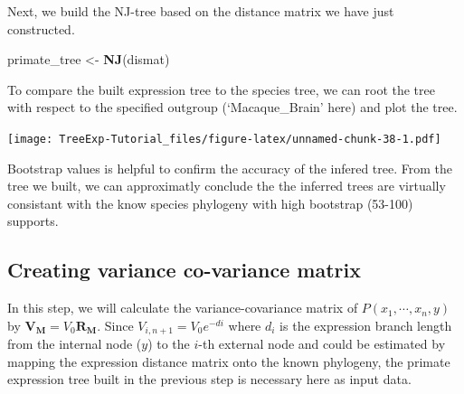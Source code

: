 \documentclass[]{book}
\newenvironment{Shaded}{\begin{snugshade}}{\end{snugshade}}
\newcommand{\DataTypeTok}[1]{\textcolor[rgb]{0.13,0.29,0.53}{#1}}
\newcommand{\DecValTok}[1]{\textcolor[rgb]{0.00,0.00,0.81}{#1}}
\newcommand{\KeywordTok}[1]{\textcolor[rgb]{0.13,0.29,0.53}{\textbf{#1}}}
\newcommand{\NormalTok}[1]{#1}
\newcommand{\OperatorTok}[1]{\textcolor[rgb]{0.81,0.36,0.00}{\textbf{#1}}}
\newcommand{\OtherTok}[1]{\textcolor[rgb]{0.56,0.35,0.01}{#1}}
\newcommand{\StringTok}[1]{\textcolor[rgb]{0.31,0.60,0.02}{#1}}
\begin{document}
Next, we build the NJ-tree based on the distance matrix we have just constructed.

\begin{Shaded}
\begin{Highlighting}[]
\NormalTok{primate_tree <-}\StringTok{ }\KeywordTok{NJ}\NormalTok{(dismat)}
\end{Highlighting}
\end{Shaded}

To compare the built expression tree to the species tree, we can root the tree with respect to the specified outgroup (`Macaque\_Brain' here) and plot the tree.

\begin{Shaded}
\end{Shaded}

\texttt{[image: TreeExp-Tutorial\_files/figure-latex/unnamed-chunk-38-1.pdf]}

Bootstrap values is helpful to confirm the accuracy of the infered tree. From the tree we built, we can approximatly conclude the the inferred trees are virtually consistant with the know species phylogeny with high bootstrap (53-100) supports.

\hypertarget{creating-variance-co-variance-matrix}{%
\subsection{Creating variance co-variance matrix}\label{creating-variance-co-variance-matrix}}

In this step, we will calculate the variance-covariance matrix of \(P\left(x_1,\cdots,x_n,y\right)\) by \(\boldsymbol{V_M}=V_0\boldsymbol{R_M}\). Since \(V_{i,n+1}=V_{0}e^{-di}\) where \(d_i\) is the expression branch length from the internal node (\(y\)) to the \(i\)-th external node and could be estimated by mapping the expression distance matrix onto the known phylogeny, the primate expression tree built in the previous step is necessary here as input data.
\end{document}
